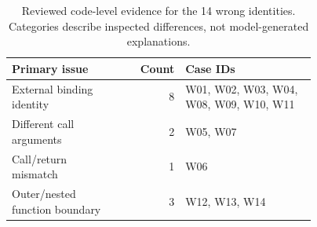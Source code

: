 \begin{table}[htbp]
\caption{Reviewed code-level evidence for the 14 wrong identities. Categories describe inspected differences, not model-generated explanations.}
\label{tab:exp4-wrong}
\centering\small
\begin{tabular}{p{0.34\linewidth}rp{0.43\linewidth}}
\toprule
Primary issue & Count & Case IDs\\
\midrule
External binding identity & 8 & W01, W02, W03, W04, W08, W09, W10, W11\\
Different call arguments & 2 & W05, W07\\
Call/return mismatch & 1 & W06\\
Outer/nested function boundary & 3 & W12, W13, W14\\
\bottomrule
\end{tabular}
\end{table}
